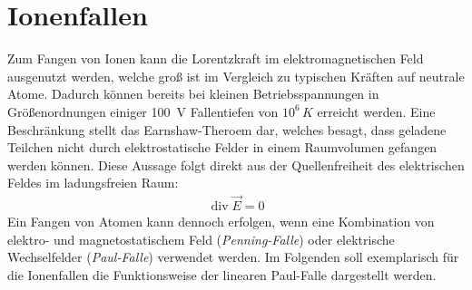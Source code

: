 \documentclass[twocolumn]{revtex4}
\DeclareMathOperator{\divergence}{div}
\begin{document}
\section{Ionenfallen}
Zum Fangen von Ionen kann die Lorentzkraft im elektromagnetischen Feld ausgenutzt werden, welche groß ist im Vergleich zu typischen Kräften auf neutrale Atome.
Dadurch können bereits bei kleinen Betriebsspannungen in Größenordnungen einiger \SI{100}{V} Fallentiefen von $10^6 \, \si{K}$ erreicht werden.
Eine Beschränkung stellt das Earnshaw-Theroem dar, welches besagt, dass geladene Teilchen nicht durch elektrostatische Felder in einem Raumvolumen gefangen werden können.
Diese Aussage folgt direkt aus der Quellenfreiheit des elektrischen Feldes im ladungsfreien Raum:
\begin{align*}
	\divergence \vec{E} = 0
\end{align*}
Ein Fangen von Atomen kann dennoch erfolgen, wenn eine Kombination von elektro- und magnetostatischem Feld (\emph{Penning-Falle}) oder elektrische Wechselfelder (\emph{Paul-Falle}) verwendet werden.
Im Folgenden soll exemplarisch für die Ionenfallen die Funktionsweise der linearen Paul-Falle dargestellt werden.
\end{document}
